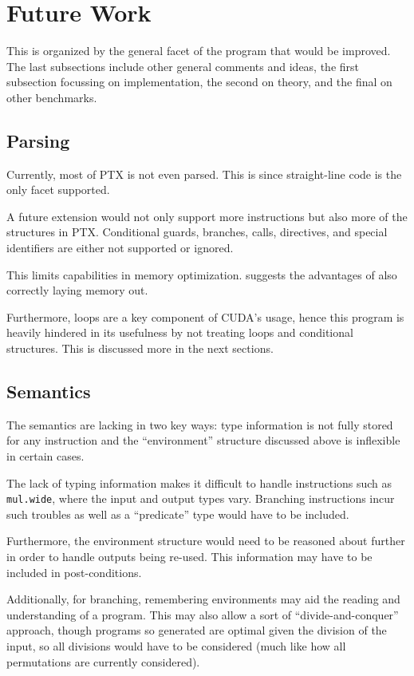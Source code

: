 \documentclass[letterpaper,twocolumn,10pt]{article}
\begin{document}
\section{Future Work}

This is organized by the general facet of the program that would be improved.
The last subsections include other general comments and ideas, the first subsection
focussing on implementation, the second on theory, and the final on other benchmarks.

\subsection{Parsing}

Currently, most of PTX is not even parsed. This is since straight-line
code is the only facet supported.

A future extension would not only support more instructions but also more
of the structures in PTX. Conditional guards, branches, calls, directives,
and special identifiers are either not supported or ignored.

This limits capabilities in memory optimization. \cite{CUDALoops} suggests
the advantages of also correctly laying memory out.

Furthermore, loops are a key component of CUDA's usage, hence this program
is heavily hindered in its usefulness by not treating loops and conditional
structures. This is discussed more in the next sections.

\subsection{Semantics}

The semantics are lacking in two key ways: type information is not fully
stored for any instruction and the ``environment'' structure discussed
above is inflexible in certain cases.

The lack of typing information makes it difficult to handle instructions such
as \texttt{mul.wide}, where the input and output types vary. Branching instructions
incur such troubles as well as a ``predicate'' type would have to be included.

Furthermore, the environment structure would need to be reasoned about further
in order to handle outputs being re-used. This information may have to be
included in post-conditions.

Additionally, for branching, remembering environments may aid the reading
and understanding of a program.
This may also allow a sort of ``divide-and-conquer'' approach, though programs
so generated are optimal given the division of the input, so all divisions would
have to be considered (much like how all permutations are currently considered).
\end{document}
